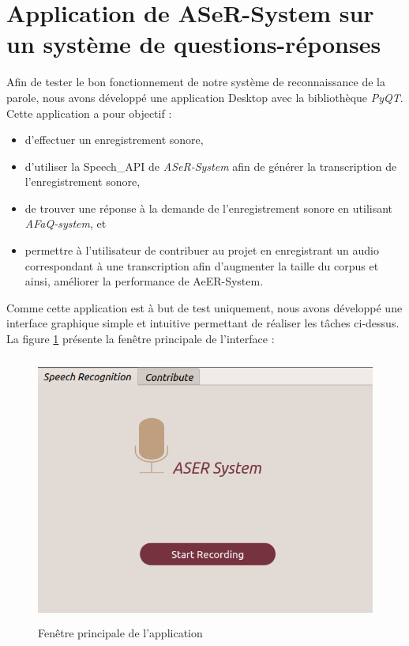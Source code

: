 \section{Application de ASeR-System sur un système de questions-réponses}
Afin de tester le bon fonctionnement de notre système de reconnaissance de la parole, nous avons développé une application Desktop avec la bibliothèque \textit{PyQT}. Cette application a pour objectif : 
\begin{itemize}
    \item d'effectuer un enregistrement sonore,
    \item d'utiliser la Speech\_API de \textit{ASeR-System} afin de générer la transcription de l'enregistrement sonore, 
    \item de trouver une réponse à la demande de l'enregistrement sonore en utilisant \textit{AFaQ-system}, et
    \item permettre à l'utilisateur de contribuer au projet en enregistrant un audio correspondant à une transcription afin d'augmenter la taille du corpus et ainsi, améliorer la performance de AeER-System.\\
\end{itemize}

Comme cette application est à but de test uniquement, nous avons développé une interface graphique simple et intuitive  permettant de réaliser les tâches ci-dessus. La figure \ref{main_window} présente la fenêtre principale de l'interface :

\begin{figure}[H]
     \centering
     \includegraphics[height=250pt,width=430pt]{images/chap4/main_window.png}
     \caption{Fenêtre principale de l'application}
     \label{main_window}
 \end{figure}
 
